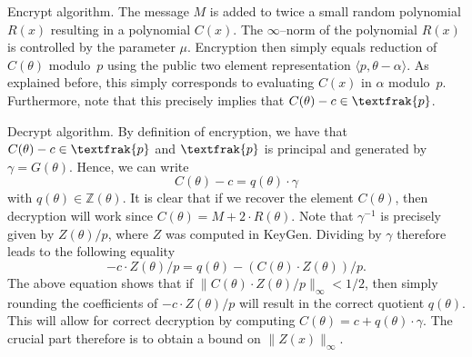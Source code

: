 \documentclass[a4paper, 12pt]{article}
\newcommand{\ndash}{\nobreakdash --}
\newcommand{\bb}[1]{\mathbb{#1}}
\newcommand{\tfr}[1]{\textfrak{#1}}
\newcommand{\tsf}[1]{\textsf{#1}}
\begin{document}
	
	\begin{paralgorithm}{\tsf{Encrypt} algorithm.}
		The message $M$ is added to twice a small random polynomial $R(x)$ resulting in a polynomial $C(x)$. 
		The $\infty$\ndash norm of the polynomial $R(x)$ is controlled by the parameter $\mu$. 
		Encryption then simply equals reduction of $C(\theta)$ modulo~$p$ using the public two element representation $\langle p, \theta - \alpha\rangle$.
		As explained before, this simply corresponds to evaluating $C(x)$ in $\alpha$ modulo~$p$. Furthermore, note that this precisely implies that $C(\theta) - c \in \tfr{p}$.
	\end{paralgorithm}
	
	\begin{paralgorithm}{\tsf{Decrypt} algorithm.}
		By definition of encryption, we have that $C(\theta) - c \in \tfr{p}$ and $\tfr{p}$ is principal and generated by $\gamma = G(\theta)$. Hence, we can write
		\[
		C(\theta) - c = q(\theta) \cdot \gamma
		\]
		with $q(\theta) \in \bb{Z}(\theta)$. It is clear that if we recover the element $C(\theta)$, then decryption
		will work since $C(\theta) = M + 2 \cdot R(\theta)$. Note that $\gamma^{-1}$ is precisely given by $Z(\theta)/p$, where $Z$ was computed in \tsf{KeyGen}. Dividing by $\gamma$ therefore leads to the following equality
		\[
		-c \cdot Z(\theta)/p = q(\theta)-(C(\theta) \cdot Z(\theta))/p.
		\]
		The above equation shows that if $\|C(\theta) \cdot Z(\theta)/p\|_\infty < 1/2$, then simply rounding the coefficients of $-c \cdot Z(\theta)/p$ will result in the correct quotient $q(\theta)$. 
		This will allow for correct decryption by computing $C(\theta) = c + q(\theta) \cdot \gamma$. The crucial part therefore is to obtain a bound on $\|Z(x)\|_\infty$.
	\end{paralgorithm}
	
\end{document}
